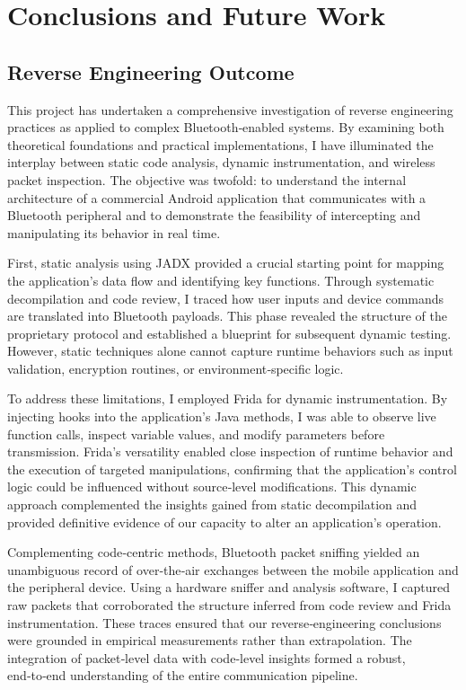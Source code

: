 \chapter{Conclusions and Future Work}
\section{Reverse Engineering Outcome}
This project has undertaken a comprehensive investigation of reverse engineering practices as applied to complex Bluetooth‑enabled systems. By examining both theoretical foundations and practical implementations, I have illuminated the interplay between static code analysis, dynamic instrumentation, and wireless packet inspection. The objective was twofold: to understand the internal architecture of a commercial Android application that communicates with a Bluetooth peripheral and to demonstrate the feasibility of intercepting and manipulating its behavior in real time.

First, static analysis using JADX provided a crucial starting point for mapping the application’s data flow and identifying key functions. Through systematic decompilation and code review, I traced how user inputs and device commands are translated into Bluetooth payloads. This phase revealed the structure of the proprietary protocol and established a blueprint for subsequent dynamic testing. However, static techniques alone cannot capture runtime behaviors such as input validation, encryption routines, or environment‑specific logic.

To address these limitations, I employed Frida for dynamic instrumentation. By injecting hooks into the application’s Java methods, I was able to observe live function calls, inspect variable values, and modify parameters before transmission. Frida’s versatility enabled close inspection of runtime behavior and the execution of targeted manipulations, confirming that the application’s control logic could be influenced without source‑level modifications. This dynamic approach complemented the insights gained from static decompilation and provided definitive evidence of our capacity to alter an application’s operation.

Complementing code‑centric methods, Bluetooth packet sniffing yielded an unambiguous record of over‑the‑air exchanges between the mobile application and the peripheral device. Using a hardware sniffer and analysis software, I captured raw packets that corroborated the structure inferred from code review and Frida instrumentation. These traces ensured that our reverse‑engineering conclusions were grounded in empirical measurements rather than extrapolation. The integration of packet‑level data with code‑level insights formed a robust, end‑to‑end understanding of the entire communication pipeline.

